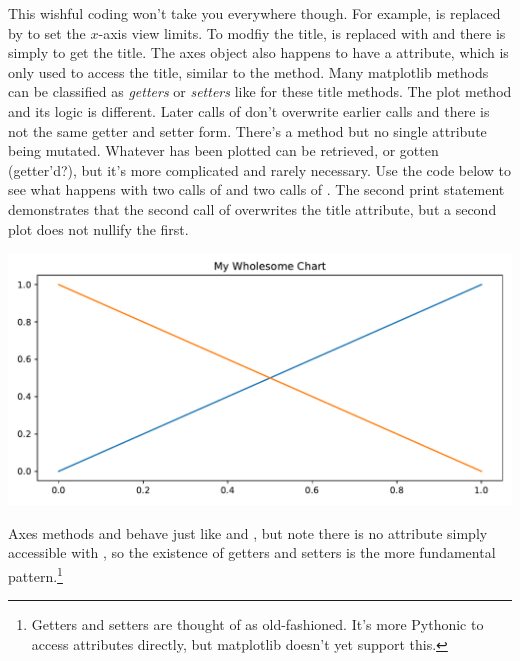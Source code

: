 This wishful coding won't take you everywhere though. For example,  is replaced by  to set the $x$-axis view limits. To modfiy the title,  is replaced with  and there is  simply to get the title. The axes object also happens to have a  attribute, which is only used to access the title, similar to the  method. Many matplotlib methods can be classified as \emph{getters} or \emph{setters} like for these title methods. The plot method and its logic is different. Later calls of  don't overwrite earlier calls and there is not the same getter and setter form. There's a  method but no single  attribute being mutated. Whatever has been plotted can be retrieved, or gotten (getter'd?), but it's more complicated and rarely necessary. Use the code below to see what happens with two calls of  and two calls of . The second print statement demonstrates that the second call of  overwrites the title attribute, but a second plot does not nullify the first. 



\begin{center}
    \includegraphics[width = .7\textwidth]{figures/proseplots/gettersetter.pdf}
\end{center}

Axes methods  and  behave just like  and , but note there is no attribute simply accessible with , so the existence of getters and setters is the more fundamental pattern.\footnote{Getters and setters are thought of as old-fashioned. It's more Pythonic to access attributes directly, but matplotlib doesn't yet support this.}

